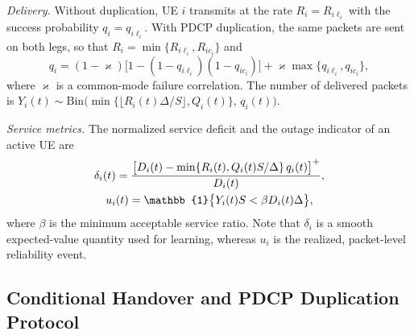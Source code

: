 \documentclass[journal]{IEEEtran}
\newcommand{\ind}{\mathbb{1}}
\begin{document}
\emph{Delivery.} Without duplication, UE $i$ transmits at the rate
$R_i=R_{i\ell_i}$ with the success probability $q_i=q_{i\ell_i}$. With PDCP
duplication, the same packets are sent on both legs, so that
$R_i=\min\{R_{i\ell_i},R_{ic_i}\}$ and
\begin{equation}
q_i=(1-\varkappa)\big[1-(1-q_{i\ell_i})(1-q_{ic_i})\big]+\varkappa\max\{q_{i\ell_i},q_{ic_i}\},
\label{eq:dup}
\end{equation}
where $\varkappa$ is a common-mode failure correlation. The number of
delivered packets is
$Y_i(t)\sim\mathrm{Bin}\big(\min\{\lfloor R_i(t)\Delta/S\rfloor,Q_i(t)\},\,q_i(t)\big)$.

\emph{Service metrics.} The normalized service deficit and the outage
indicator of an active UE are
\begin{gather}
\delta_i(t)=\frac{\big[D_i(t)-\min\{R_i(t),Q_i(t)S/\Delta\}\,q_i(t)\big]^+}{D_i(t)},\notag\\
u_i(t)=\ind\big\{Y_i(t)S<\beta D_i(t)\Delta\big\},
\label{eq:service}
\end{gather}
where $\beta$ is the minimum acceptable service ratio. Note that $\delta_i$ is
a smooth expected-value quantity used for learning, whereas $u_i$ is the
realized, packet-level reliability event.

\subsection{Conditional Handover and PDCP Duplication Protocol}
\label{sec:protocol}
\end{document}
